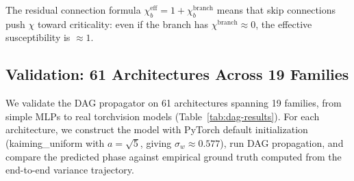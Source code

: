 \documentclass[10pt]{article}
\begin{document}
The residual connection formula $\chi_b^{\mathrm{eff}} = 1 + \chi_b^{\mathrm{branch}}$ means that skip connections push $\chi$ toward criticality: even if the branch has $\chi^{\mathrm{branch}} \approx 0$, the effective susceptibility is $\approx 1$.

\subsection{Validation: 61 Architectures Across 19 Families}

We validate the DAG propagator on 61 architectures spanning 19 families, from simple MLPs to real torchvision models (Table~\ref{tab:dag-results}).  For each architecture, we construct the model with PyTorch default initialization (kaiming\_uniform with $a = \sqrt{5}$, giving $\sigma_w \approx 0.577$), run DAG propagation, and compare the predicted phase against empirical ground truth computed from the end-to-end variance trajectory.
\end{document}
